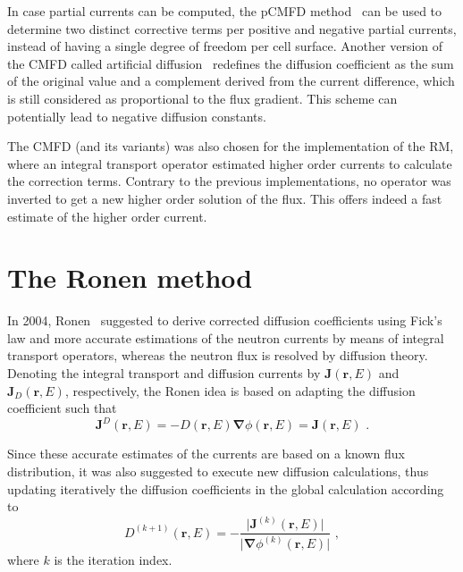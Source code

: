\documentclass[letterpaper]{physor2020}
\newcommand{\rr}{\ensuremath{\bm{r}}}
\newcommand{\bnabla}{\ensuremath{\bm{\nabla}}}
\newcommand{\rE}{\ensuremath{(\rr,E)}}
\begin{document}
In case partial currents can be computed, the pCMFD method~\cite{Cho-2003} can be used to determine two distinct corrective terms per positive and negative partial currents, instead of having a single degree of freedom per cell surface. Another version of the CMFD called artificial diffusion~\cite{Zhu-2016,Jarrett-2016} redefines the diffusion coefficient as the sum of the original value and a complement derived from the current difference, which is still considered as proportional to the flux gradient. This scheme can potentially lead to negative diffusion constants.

The CMFD (and its variants) was also chosen for the implementation of the RM, where an integral transport operator estimated higher order currents to calculate the correction terms. Contrary to the previous implementations, no operator was inverted to get a new higher order solution of the flux. This offers indeed a fast estimate of the higher order current.


\section{The Ronen method} 
\label{sec:RM}

In 2004, Ronen~\cite{Ronen-2004} suggested to derive corrected diffusion coefficients using Fick's law and more accurate estimations of the neutron currents by means of integral transport operators, whereas the neutron flux is resolved by diffusion theory. Denoting the integral transport and diffusion currents by $\bm{J}\rE$ and $\bm{J}_D\rE$, respectively, the Ronen idea is based on adapting the diffusion coefficient such that
\begin{equation}\label{eq:Fick}
\bm{J}^D\rE = -D\rE\bnabla\phi\rE = \bm{J}\rE \,\, . 
\end{equation}

Since these accurate estimates of the currents are based on a known flux distribution, it was also suggested to execute new diffusion calculations, thus updating iteratively the diffusion coefficients in the global calculation according to 
\begin{equation}\label{eq:RM-it}
D^{(k+1)}\rE = - \frac{\lvert \bm{J}^{(k)}\rE\rvert}{\lvert\bnabla\phi^{(k)}\rE\rvert} \,\, ,
\end{equation}
where $k$ is the iteration index. %
\end{document}
